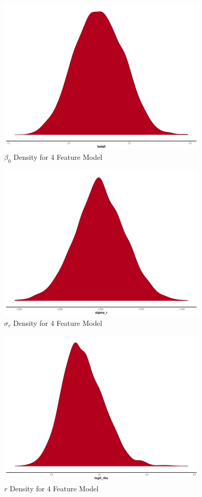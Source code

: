 \documentclass[11pt]{article}
\begin{document}
\begin{figure}[h!] 
	\centering
  \includegraphics[height=75mm]{density_beta0.png}
  \caption{$\beta_0$ Density for 4 Feature Model}
  \label{fig:dbeta0}
\end{figure}

\begin{figure}[h!] 
	\centering
  \includegraphics[height=75mm]{density_sigma_r.png}
  \caption{$\sigma_r$ Density for 4 Feature Model}
  \label{fig:dsigma_r}
\end{figure}

\begin{figure}[h!] 
	\centering
  \includegraphics[height=75mm]{density_logit_rho.png}
  \caption{$r$ Density for 4 Feature Model}
  \label{fig:dlogit_rho}
\end{figure}
\end{document}
